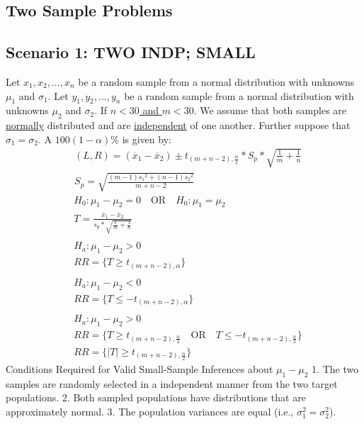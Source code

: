 \documentclass[fontsize=6pt, paper=a4]{scrartcl}
\begin{document}
\begin{multicols*}{4}
{\section{Two Sample Problems}
\subsection{Scenario 1: TWO INDP; SMALL}
Let $x_1,x_2,...,x_n$ be a random sample from a normal distribution with unknowns $\mu_1$ and $\sigma_1$.
Let $y_1,y_2,...,y_n$ be a random sample from a normal distribution with unknowns $\mu_2$ and $\sigma_2$. If \underline{$n<30$ and $m<30$}. We assume that both samples are \underline{normally} distributed and are \underline{independent} of one another.
Further suppose that $\sigma_1=\sigma_2$. A $100(1-\alpha)\%$ is given by:
\begin{align}
	&(L,R)=(\overline{x}_1-\overline{x}_2)\pm t_{(m+n-2), \frac{\alpha}{2}}*S_p*\sqrt{\frac{1}{m}+\frac{1}{n}}\\
	&{S_p}=\sqrt{\frac{(m-1){s_1}^2+(n-1){s_2}^2}{m+n-2}}
\end{align}
\begin{align}
	&H_0:\mu_1-\mu_2=0 \quad \textrm{OR} \quad H_0:\mu_1=\mu_2\\
	&T=\frac{\overline{x}_1-\overline{x}_2}{s_p*\sqrt{\frac{1}{m}+\frac{1}{n}}}\\ \\
	&H_a:\mu_1-\mu_2>0\\
	&RR=\{T \geq t_{(m+n-2),\alpha}\} \\ \\
	&H_a:\mu_1-\mu_2<0\\
	&RR=\{T \leq -t_{(m+n-2),\alpha}\} \\ \\
	&H_a:\mu_1-\mu_2>0\\
	&RR=\{T \geq t_{(m+n-2),\frac{\alpha}{2}} \quad\textrm{OR}\quad T \leq -t_{(m+n-2),\frac{\alpha}{2}}\}\\
	&RR=\{\left|T\right|\geq t_{(m+n-2),\frac{\alpha}{2}}\}
\end{align}
Conditions Required for Valid Small-Sample Inferences about $\mu_1-\mu_2$
1. The two samples are randomly selected in a independent manner from the two
target populations.
2. Both sampled populations have distributions that are approximately normal. 3. The population variances are equal (i.e., $\sigma_1^2=\sigma_2^2$).

}
\end{multicols*}
\end{document}
